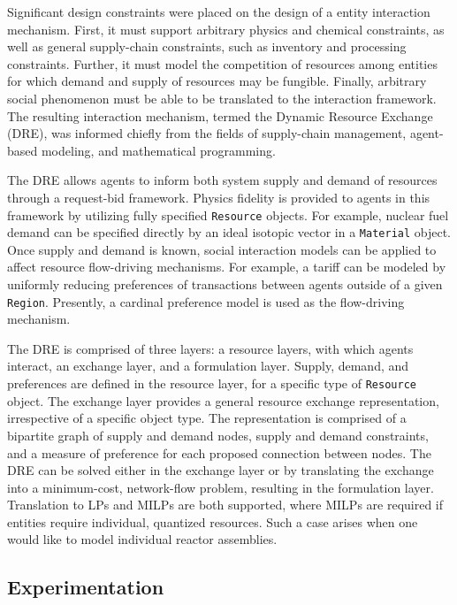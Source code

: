 Significant design constraints were placed on the design of a entity interaction
mechanism. First, it must support arbitrary physics and chemical constraints, as
well as general supply-chain constraints, such as inventory and processing
constraints. Further, it must model the competition of resources among entities
for which demand and supply of resources may be fungible. Finally, arbitrary
social phenomenon must be able to be translated to the interaction
framework. The resulting interaction mechanism, termed the Dynamic Resource
Exchange (DRE), was informed chiefly from the fields of supply-chain management,
agent-based modeling, and mathematical programming.

The DRE allows agents to inform both system supply and demand of resources
through a request-bid framework. Physics fidelity is provided to agents in this
framework by utilizing fully specified \texttt{Resource} objects. For example,
nuclear fuel demand can be specified directly by an ideal isotopic vector in a
\texttt{Material} object. Once supply and demand is known, social interaction
models can be applied to affect resource flow-driving mechanisms. For example, a
tariff can be modeled by uniformly reducing preferences of transactions between
agents outside of a given \texttt{Region}. Presently, a cardinal preference
model is used as the flow-driving mechanism.

The DRE is comprised of three layers: a resource layers, with which agents
interact, an exchange layer, and a formulation layer. Supply, demand, and
preferences are defined in the resource layer, for a specific type of
\texttt{Resource} object. The exchange layer provides a general resource
exchange representation, irrespective of a specific object type. The
representation is comprised of a bipartite graph of supply and demand nodes,
supply and demand constraints, and a measure of preference for each proposed
connection between nodes. The DRE can be solved either in the exchange layer or
by translating the exchange into a minimum-cost, network-flow problem, resulting
in the formulation layer. Translation to LPs and MILPs are both supported, where
MILPs are required if entities require individual, quantized resources. Such a
case arises when one would like to model individual reactor assemblies.

\subsection{Experimentation}


